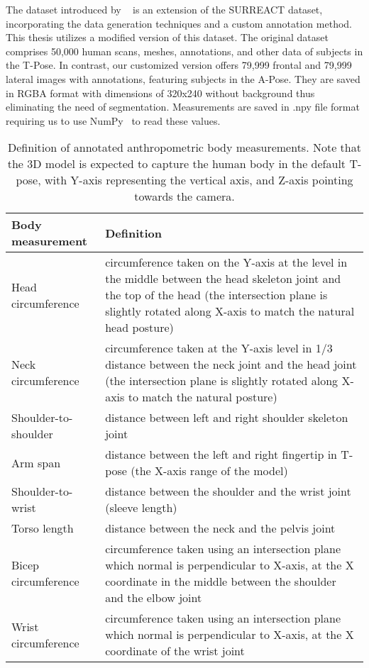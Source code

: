 The dataset introduced by ~\cite{super} is an extension of the SURREACT dataset, incorporating the data generation techniques and a custom annotation method. This thesis utilizes a modified version of this dataset. The original dataset comprises 50,000 human scans, meshes, annotations, and other data of subjects in the T-Pose. In contrast, our customized version offers 79,999 frontal and 79,999 lateral images with annotations, featuring subjects in the A-Pose.  They are saved in RGBA format with dimensions of 320x240 without background thus eliminating the need of segmentation. Measurements are saved in .npy file format requiring us to use NumPy~\cite{numpy} to read these values.

\begin{table}
	\caption[...]{Definition of annotated anthropometric body measurements. Note that the 3D model is expected to capture the human body in the default T-pose, with Y-axis representing the vertical axis, and Z-axis pointing towards the camera.}
	\label{tab:cas}
	\begin{center}
		\footnotesize
		\begin{tabularx}{\textwidth}{lX}\hline
			Body measurement & Definition\\\hline
			Head circumference & circumference taken on the Y-axis at the level in the middle between the head skeleton joint and the top of the head (the intersection plane is slightly rotated along X-axis to match the natural head posture)\\
			Neck circumference & circumference taken at the Y-axis level in 1/3 distance between the neck joint and the head joint (the intersection plane is slightly rotated along X-axis to match the natural posture)\\
			Shoulder-to-shoulder & distance between left and right shoulder skeleton joint\\
			Arm span & distance between the left and right fingertip in T-pose (the X-axis range of the model)\\
			Shoulder-to-wrist & distance between the shoulder and the wrist joint (sleeve length)\\
			Torso length & distance between the neck and the pelvis joint\\
			Bicep circumference & circumference taken using an intersection plane which normal is perpendicular to X-axis, at the X coordinate in the middle between the shoulder and the elbow joint\\
			Wrist circumference & circumference taken using an intersection plane which normal is perpendicular to X-axis, at the X coordinate of the wrist joint\\

\end{tabularx}
\end{center}
\end{table}
